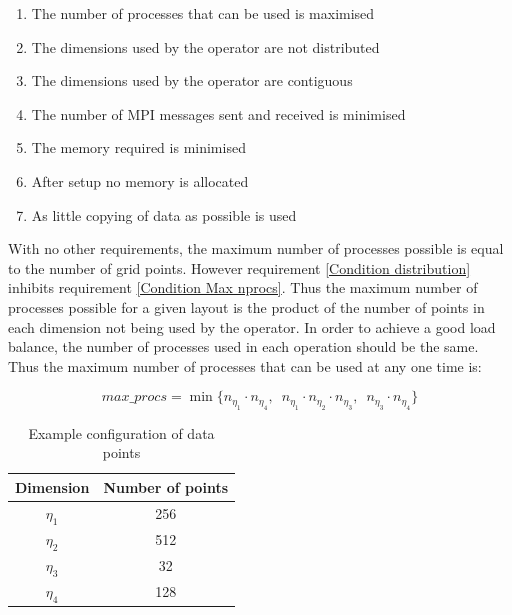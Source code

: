 \begin{tcolorbox} [enhanced,title=Requirements,attach boxed title to top left={xshift=10pt,yshift=-\tcboxedtitleheight/2},boxed title style={size=small}]

\begin{enumerate}
 \item The number of processes that can be used is maximised \label{Condition Max nprocs}
 \item The dimensions used by the operator are not distributed  \label{Condition distribution}
 \item The dimensions used by the operator are contiguous \label{Condition contiguous}
 \item The number of MPI messages sent and received is minimised \label{Condition MPI overhead}
 \item The memory required is minimised \label{Condition memory}
 \item After setup no memory is allocated \label{Condition allocation}
 \item As little copying of data as possible is used \label{Condition copying}
\end{enumerate}

\end{tcolorbox}

With no other requirements, the maximum number of processes possible is equal to the number of grid points. However requirement \ref{Condition distribution} inhibits requirement \ref{Condition Max nprocs}. Thus the maximum number of processes possible for a given layout is the product of the number of points in each dimension not being used by the operator. In order to achieve a good load balance, the number of processes used in each operation should be the same. Thus the maximum number of processes that can be used at any one time is:

$$max\_procs = \min\{n_{\eta_1}\!\!\cdot n_{\eta_4},\, \, \, n_{\eta_1}\!\!\cdot n_{\eta_2}\!\! \cdot n_{\eta_3},\, \, \, n_{\eta_3}\!\!\cdot n_{\eta_4}\}$$

\begin{table}
\centering
 \begin{tabular}{|c|c|}
  \hline
  Dimension & Number of points\\
  \hline
  $\eta_1$ & 256\\
  \hline
  $\eta_2$ & 512\\
  \hline
  $\eta_3$ & 32\\
  \hline
  $\eta_4$ & 128\\
  \hline
 \end{tabular}
 \caption{\label{tab::Grid example} Example configuration of data points}
\end{table}

